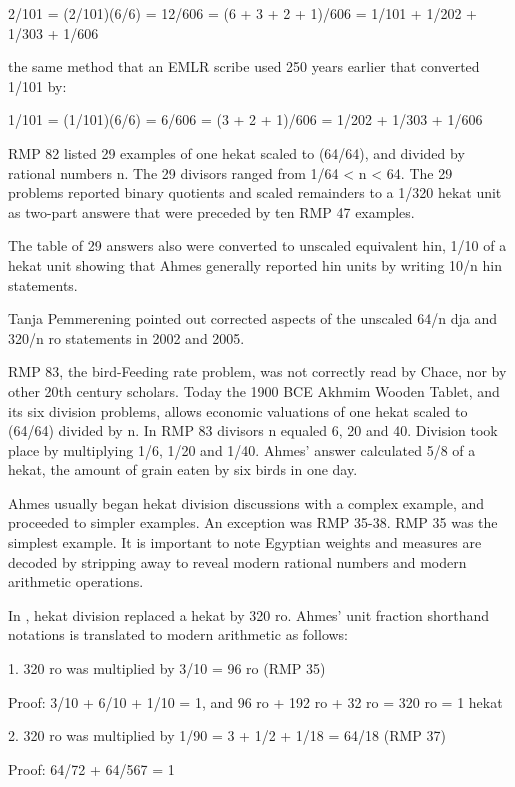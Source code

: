 \documentclass[12pt]{article}
\begin{document}
2/101 = (2/101)(6/6) = 12/606 = (6 + 3 + 2 + 1)/606 = 1/101 + 1/202 + 1/303 + 1/606

the same method that an EMLR scribe used 250 years earlier that converted 1/101 by:

1/101 = (1/101)(6/6) = 6/606 = (3 + 2 + 1)/606 = 1/202 + 1/303 + 1/606 

RMP 82 listed 29 examples of one hekat scaled to (64/64), and divided by rational numbers n. The 29 divisors ranged from 1/64 < n < 64. The 29 problems reported binary quotients and scaled remainders to a 1/320 hekat unit as two-part answere that were preceded by ten RMP 47 examples.

The table of 29 answers also were converted to unscaled equivalent hin, 1/10 of a hekat unit showing that Ahmes generally reported hin units by writing 10/n hin statements.

Tanja Pemmerening pointed out corrected aspects of the unscaled 64/n dja and 320/n ro statements in 2002 and 2005.

RMP 83, the bird-Feeding rate problem, was not correctly read by Chace, nor by other 20th century scholars. Today the 1900 BCE Akhmim Wooden Tablet, and its six division problems, allows economic valuations of one hekat scaled to (64/64) divided by n. In RMP 83 divisors n equaled 6, 20 and 40. Division took place by multiplying 1/6, 1/20 and 1/40. Ahmes' answer calculated 5/8 of a hekat, the amount of grain eaten by six birds in one day.

Ahmes usually began hekat division discussions with a complex example, and proceeded to simpler examples. An exception was RMP 35-38. RMP 35 was the simplest example. It is important to note Egyptian weights and measures are decoded by stripping away  to reveal modern rational numbers and modern arithmetic operations.

In , hekat division replaced a hekat by 320 ro. Ahmes' unit fraction shorthand notations is translated to modern arithmetic as follows:

1. 320 ro was multiplied by 3/10 = 96 ro (RMP 35)

Proof: 3/10 + 6/10 + 1/10 = 1, and 96 ro + 192 ro + 32 ro = 320 ro = 1 hekat

2. 320 ro was multiplied by 1/90 = 3 + 1/2 + 1/18 = 64/18 (RMP 37)

Proof: 64/72 + 64/567 = 1 
\end{document}
